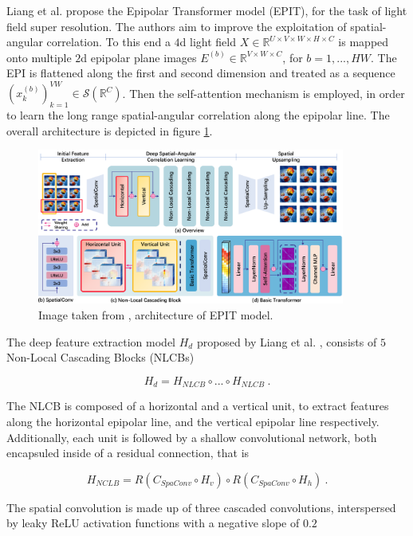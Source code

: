 Liang et al. \cite{liangLearningNonLocalSpatialAngular2023a} propose the Epipolar Transformer model (EPIT),
for the task of light field super resolution.
The authors aim to improve the exploitation of spatial-angular correlation.
To this end a $4$d light field $X \in \mathbb R^{U \times V \times W \times H \times C}$ 
is mapped onto multiple $2$d epipolar plane images $E^{(b)} \in \mathbb R^{V \times W \times C}$, for $b = 1, ..., HW$.
The EPI is flattened along the first and second dimension and treated as a sequence $(x_k^{(b)})_{k=1}^{VW} \in \mathcal S (\mathbb R^C)$.
Then the self-attention mechanism is employed, 
in order to learn the long range spatial-angular correlation along the epipolar line.
The overall architecture is depicted in figure \ref{fig:epit}.

\begin{figure}[h!]
    \includegraphics[width=0.9\textwidth]{models/lfsr/imgs/epit.png}
    \caption{Image taken from \cite{caiMSTMultistageSpectralwise2022a}, architecture of EPIT model.}
    \label{fig:epit}
\end{figure}

The deep feature extraction model $H_d$ proposed by Liang et al. \cite{liangLearningNonLocalSpatialAngular2023a}, consists of $5$ Non-Local Cascading Blocks (NLCBs)

    $$ H_d = H_{NLCB} \circ ... \circ H_{NLCB} ~.$$

The NLCB is composed of a horizontal and a vertical unit,
to extract features along the horizontal epipolar line, 
and the vertical epipolar line respectively. 
Additionally, each unit is followed by a shallow convolutional network, 
both encapsuled inside of a residual connection, that is

    $$H_{NCLB} = R(C_{SpaConv} \circ H_v) \circ R(C_{SpaConv} \circ H_h) ~.$$

The spatial convolution is made up of three cascaded convolutions, 
interspersed by leaky ReLU activation functions with a negative slope of $0.2$

